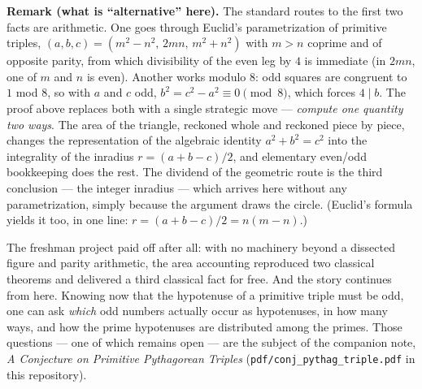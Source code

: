 \documentclass[12pt]{article}
\theoremstyle{plain}
\begin{document}
{\bf Remark (what is ``alternative'' here).} The standard routes to the
first two facts are arithmetic. One goes through Euclid's parametrization
of primitive triples, $(a, b, c) = (m^2 - n^2,\, 2mn,\, m^2 + n^2)$ with
$m > n$ coprime and of opposite parity, from which divisibility of the
even leg by $4$ is immediate (in $2mn$, one of $m$ and $n$ is even).
Another works modulo $8$: odd squares are congruent to $1$ mod $8$, so
with $a$ and $c$ odd, $b^2 = c^2 - a^2 \equiv 0 \pmod 8$, which forces
$4 \mid b$. The proof above replaces both with a single strategic move ---
{\em compute one quantity two ways\/}. The area of the triangle, reckoned
whole and reckoned piece by piece, changes the representation of the
algebraic identity $a^2 + b^2 = c^2$ into the integrality of the inradius
$r = (a + b - c)/2$, and elementary even/odd bookkeeping does the rest.
The dividend of the geometric route is the third conclusion --- the
integer inradius --- which arrives here without any parametrization, simply
because the argument draws the circle. (Euclid's formula yields it too, in
one line: $r = (a + b - c)/2 = n(m - n)$.)

The freshman project paid off after all: with no machinery beyond a
dissected figure and parity arithmetic, the area accounting reproduced two
classical theorems and delivered a third classical fact for free. And the story
continues from here. Knowing now that the hypotenuse of a primitive triple
must be odd, one can ask {\em which\/} odd numbers actually occur as
hypotenuses, in how many ways, and how the prime hypotenuses are
distributed among the primes. Those questions --- one of which remains
open --- are the subject of the companion note,
{\em A Conjecture on Primitive Pythagorean Triples\/}
(\texttt{pdf/conj\_pythag\_triple.pdf} in this repository).
\end{document}
